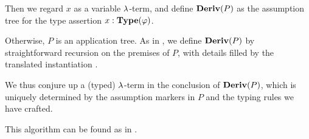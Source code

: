 \begin{algorithm}
\begin{thmenum}
\begin{thmenum}
      Then we regard \( x \) as a variable \( {\mathrm \lambda} \)-term, and define \( \op*{Deriv}(P) \) as the assumption tree for the type assertion \( x: \op*{Type}(\varphi) \).

       Otherwise, \( P \) is an application tree. As in , we define \( \op*{Deriv}(P) \) by straightforward recursion on the premises of \( P \), with details filled by the translated instantiation .

      We thus conjure up a (typed) \( {\mathrm \lambda} \)-term in the conclusion of \( \op*{Deriv}(P) \), which is uniquely determined by the assumption markers in \( P \) and the typing rules we have crafted.
    \end{thmenum}
  \end{thmenum}
\end{algorithm}
\begin{comments}
  \item This algorithm can be found as  in \cite{notebook:code}.
\end{comments}

